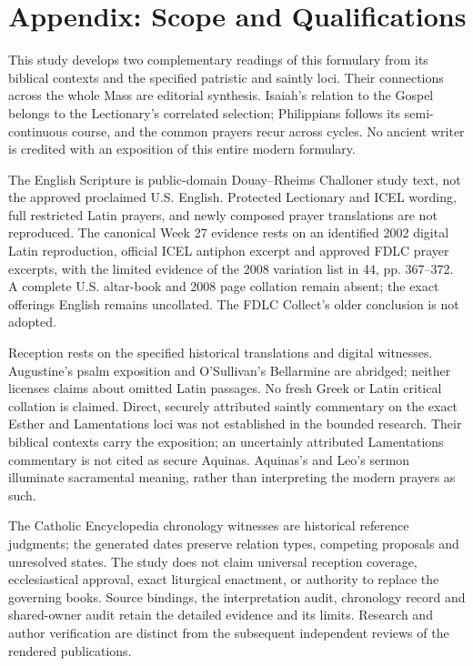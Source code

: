 \section{Appendix: Scope and Qualifications}
This study develops two complementary readings of this formulary from its biblical contexts and the specified patristic and saintly loci. Their connections across the whole Mass are editorial synthesis. Isaiah's relation to the Gospel belongs to the Lectionary's correlated selection; Philippians follows its semi-continuous course, and the common prayers recur across cycles. No ancient writer is credited with an exposition of this entire modern formulary.

The English Scripture is public-domain Douay--Rheims Challoner study text, not the approved proclaimed U.S. English. Protected Lectionary and ICEL wording, full restricted Latin prayers, and newly composed prayer translations are not reproduced. The canonical Week 27 evidence rests on an identified 2002 digital Latin reproduction, official ICEL antiphon excerpt and approved FDLC prayer excerpts, with the limited evidence of the 2008 variation list in  44, pp. 367--372. A complete U.S. altar-book and 2008 page collation remain absent; the exact offerings English remains uncollated. The FDLC Collect's older conclusion is not adopted.

Reception rests on the specified historical translations and digital witnesses. Augustine's psalm exposition and O'Sullivan's Bellarmine are abridged; neither licenses claims about omitted Latin passages. No fresh Greek or Latin critical collation is claimed. Direct, securely attributed saintly commentary on the exact Esther and Lamentations loci was not established in the bounded research. Their biblical contexts carry the exposition; an uncertainly attributed Lamentations commentary is not cited as secure Aquinas. Aquinas's  and Leo's sermon illuminate sacramental meaning, rather than interpreting the modern prayers as such.

The Catholic Encyclopedia chronology witnesses are historical reference judgments; the generated dates preserve relation types, competing proposals and unresolved states. The study does not claim universal reception coverage, ecclesiastical approval, exact liturgical enactment, or authority to replace the governing books. Source bindings, the interpretation audit, chronology record and shared-owner audit retain the detailed evidence and its limits. Research and author verification are distinct from the subsequent independent reviews of the rendered publications.

